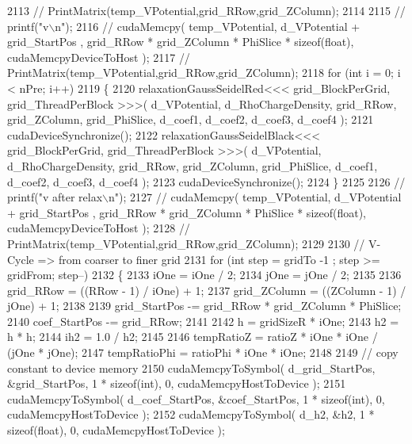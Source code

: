 \begin{DoxyCode}
2113 \textcolor{comment}{//  PrintMatrix(temp\_VPotential,grid\_RRow,grid\_ZColumn);}
2114     
2115 \textcolor{comment}{//  printf("v\(\backslash\)n");}
2116 \textcolor{comment}{//  cudaMemcpy( temp\_VPotential, d\_VPotential + grid\_StartPos , grid\_RRow * grid\_ZColumn * PhiSlice *
       sizeof(float), cudaMemcpyDeviceToHost );}
2117 \textcolor{comment}{//  PrintMatrix(temp\_VPotential,grid\_RRow,grid\_ZColumn);}
2118     \textcolor{keywordflow}{for} (\textcolor{keywordtype}{int} i = 0; i < nPre; i++)
2119     \{
2120         relaxationGaussSeidelRed<<< grid\_BlockPerGrid, grid\_ThreadPerBlock >>>( d\_VPotential, 
      d\_RhoChargeDensity, grid\_RRow, grid\_ZColumn, grid\_PhiSlice, d\_coef1, d\_coef2, d\_coef3, d\_coef4 );
2121         cudaDeviceSynchronize();
2122         relaxationGaussSeidelBlack<<< grid\_BlockPerGrid, grid\_ThreadPerBlock >>>( d\_VPotential, 
      d\_RhoChargeDensity, grid\_RRow, grid\_ZColumn, grid\_PhiSlice, d\_coef1, d\_coef2, d\_coef3, d\_coef4 );
2123         cudaDeviceSynchronize();
2124     \}
2125 
2126 \textcolor{comment}{//  printf("v after relax\(\backslash\)n");}
2127 \textcolor{comment}{//  cudaMemcpy( temp\_VPotential, d\_VPotential + grid\_StartPos , grid\_RRow * grid\_ZColumn * PhiSlice *
       sizeof(float), cudaMemcpyDeviceToHost );}
2128 \textcolor{comment}{//  PrintMatrix(temp\_VPotential,grid\_RRow,grid\_ZColumn);}
2129     
2130     \textcolor{comment}{// V-Cycle => from coarser to finer grid}
2131     \textcolor{keywordflow}{for} (\textcolor{keywordtype}{int} step = gridTo -1 ; step >= gridFrom; step--)
2132     \{
2133         iOne = iOne / 2;
2134         jOne = jOne / 2;
2135     
2136         grid\_RRow       = ((RRow - 1) / iOne) + 1;
2137         grid\_ZColumn    = ((ZColumn - 1) / jOne) + 1;
2138 
2139         grid\_StartPos -= grid\_RRow * grid\_ZColumn * PhiSlice;
2140         coef\_StartPos -= grid\_RRow;
2141     
2142         h   = gridSizeR * iOne;
2143         h2  = h * h;
2144         ih2 = 1.0 / h2;
2145     
2146         tempRatioZ = ratioZ * iOne * iOne / (jOne * jOne);
2147         tempRatioPhi = ratioPhi * iOne * iOne;
2148 
2149         \textcolor{comment}{// copy constant to device memory}
2150         cudaMemcpyToSymbol( d\_grid\_StartPos, &grid\_StartPos, 1 * \textcolor{keyword}{sizeof}(\textcolor{keywordtype}{int}), 0, cudaMemcpyHostToDevice );
2151         cudaMemcpyToSymbol( d\_coef\_StartPos, &coef\_StartPos, 1 * \textcolor{keyword}{sizeof}(\textcolor{keywordtype}{int}), 0, cudaMemcpyHostToDevice );
2152         cudaMemcpyToSymbol( d\_h2, &h2, 1 * \textcolor{keyword}{sizeof}(\textcolor{keywordtype}{float}), 0, cudaMemcpyHostToDevice );

\end{DoxyCode}
